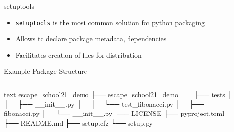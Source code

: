 \begin{frame}[c]{setuptools}
  \begin{itemize}
    \item \texttt{setuptools} is the most common solution for python packaging
    \item Allows to declare package metadata, dependencies
    \item Facilitates creation of files for distribution
  \end{itemize}
\end{frame}
\begin{frame}[c, fragile]{Example Package Structure}
  \begin{columns}[onlytextwidth, c]%
    \begin{column}{0.44\textwidth}%
      \begin{code}{text}
        escape_school21_demo
        ├── escape_school21_demo
        │   ├── tests
        │   │   ├── __init__.py
        │   │   └── test_fibonacci.py
        │   ├── fibonacci.py
        │   └── __init__.py
        ├── LICENSE
        ├── pyproject.toml
        ├── README.md
        ├── setup.cfg
        └── setup.py
      \end{code}
    \end{column}%
    \hfill%
    \begin{column}{0.55\textwidth}%
    \end{column}%
  \end{columns}%
\end{frame}

